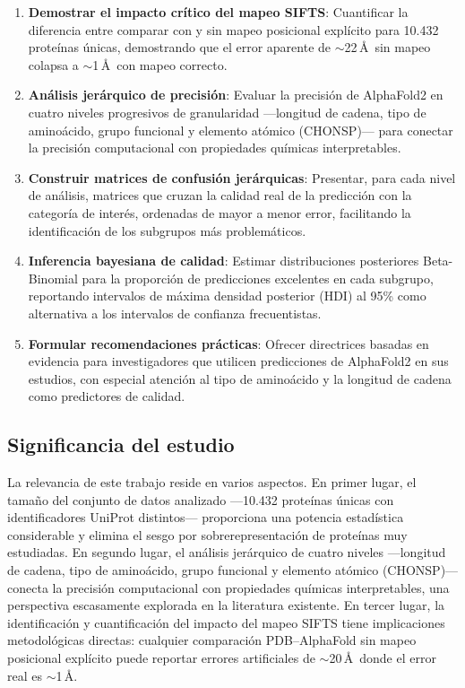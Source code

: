 \begin{enumerate}
    \item \textbf{Demostrar el impacto cr\'itico del mapeo SIFTS}: Cuantificar la diferencia entre comparar con y sin mapeo posicional expl\'icito para 10.432 prote\'inas \'unicas, demostrando que el error aparente de $\sim$22\,\AA\ sin mapeo colapsa a $\sim$1\,\AA\ con mapeo correcto.

    \item \textbf{An\'alisis jer\'arquico de precisi\'on}: Evaluar la precisi\'on de AlphaFold2 en cuatro niveles progresivos de granularidad ---longitud de cadena, tipo de amino\'acido, grupo funcional y elemento at\'omico (CHONSP)--- para conectar la precisi\'on computacional con propiedades qu\'imicas interpretables.

    \item \textbf{Construir matrices de confusi\'on jer\'arquicas}: Presentar, para cada nivel de an\'alisis, matrices que cruzan la calidad real de la predicci\'on con la categor\'ia de inter\'es, ordenadas de mayor a menor error, facilitando la identificaci\'on de los subgrupos m\'as problem\'aticos.

    \item \textbf{Inferencia bayesiana de calidad}: Estimar distribuciones posteriores Beta-Binomial para la proporci\'on de predicciones excelentes en cada subgrupo, reportando intervalos de m\'axima densidad posterior (HDI) al 95\% como alternativa a los intervalos de confianza frecuentistas.

    \item \textbf{Formular recomendaciones pr\'acticas}: Ofrecer directrices basadas en evidencia para investigadores que utilicen predicciones de AlphaFold2 en sus estudios, con especial atenci\'on al tipo de amino\'acido y la longitud de cadena como predictores de calidad.
\end{enumerate}

\subsection{Significancia del estudio}
\label{subsec:significancia}

La relevancia de este trabajo reside en varios aspectos. En primer lugar, el tama\~no del conjunto de datos analizado ---10.432 prote\'inas \'unicas con identificadores UniProt distintos--- proporciona una potencia estad\'istica considerable y elimina el sesgo por sobrerepresentaci\'on de prote\'inas muy estudiadas. En segundo lugar, el an\'alisis jer\'arquico de cuatro niveles ---longitud de cadena, tipo de amino\'acido, grupo funcional y elemento at\'omico (CHONSP)--- conecta la precisi\'on computacional con propiedades qu\'imicas interpretables, una perspectiva escasamente explorada en la literatura existente. En tercer lugar, la identificaci\'on y cuantificaci\'on del impacto del mapeo SIFTS tiene implicaciones metodol\'ogicas directas: cualquier comparaci\'on PDB--AlphaFold sin mapeo posicional expl\'icito puede reportar errores artificiales de $\sim$20\,\AA\ donde el error real es $\sim$1\,\AA.

